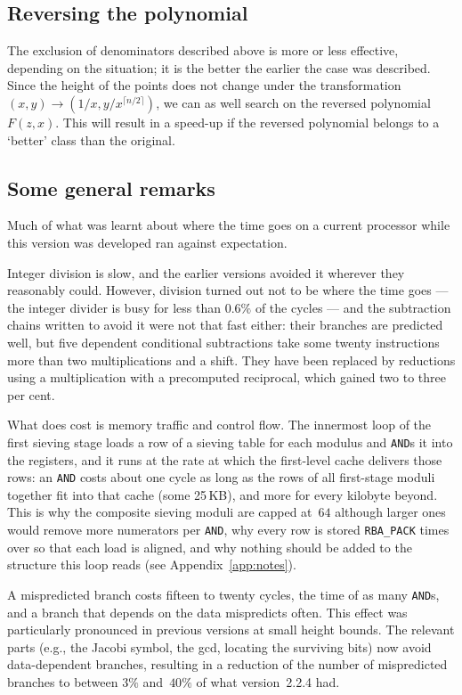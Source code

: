 \documentclass[12pt,a4paper,oneside]{amsart}
\begin{document}
\subsection{Reversing the polynomial}

The exclusion of denominators described above is more or less effective,
depending on the situation; it is the better the earlier the case was
described. Since the height of the points does not change under the
transformation $(x,y) \to (1/x, y/x^{\lceil n/2 \rceil})$, we can as well search on the
reversed polynomial $F(z,x)$. This will result in a speed-up if the
reversed polynomial belongs to a `better' class than the original.

\subsection{Some general remarks}\label{sec:remarks}

Much of what was learnt about where the time goes on a current processor
while this version was developed ran against expectation.

Integer division is slow,
and the earlier versions avoided it wherever they reasonably
could. However, division turned out not to be where the time goes --- the
integer divider is busy for less than $0.6\%$ of the cycles --- and the
subtraction chains written to avoid it were not that fast either: their
branches are predicted well, but five dependent conditional subtractions
take some twenty instructions more than two multiplications and a shift.
They have been replaced by reductions using a multiplication with a
precomputed reciprocal, which gained two to three per cent.

What does cost is memory traffic and control flow. The innermost loop of
the first sieving stage loads a row of a sieving table for each modulus and
\texttt{AND}s it into the registers, and it runs at the rate at which the
first-level cache delivers those rows: an \texttt{AND} costs about one cycle
as long as the rows of all first-stage moduli together fit into that cache
(some 25\,KB), and more for every kilobyte beyond. This is why the composite
sieving moduli are capped at~$64$ although larger ones would remove more
numerators per \texttt{AND}, why every row is stored \texttt{RBA\_PACK}
times over so that each load is aligned, and why nothing should be added to
the structure this loop reads (see Appendix~\ref{app:notes}).

A mispredicted branch costs fifteen to twenty cycles, the time of as many
\texttt{AND}s, and a branch that depends on the data mispredicts often.
This effect was particularly pronounced in previous versions at small height bounds.
The relevant parts (e.g., the Jacobi symbol, the gcd, locating the surviving
bits) now avoid data-dependent branches, resulting in a reduction of
the number of mispredicted branches to between $3\%$ and~$40\%$ of
what version~2.2.4 had.
\end{document}
